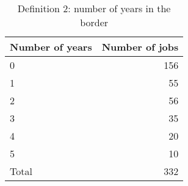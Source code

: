 \begin{table}[h!]
	\caption{Definition 2: number of years in the border}
	\centering
	\begin{tabular}{lr}
	\toprule
Number of years & Number of jobs \\
\midrule
0&156 \\
1&55 \\
2&56 \\
3&35 \\
4&20 \\
5&10 \\
Total&332 \\
\bottomrule
\end{tabular}
\end{table}
